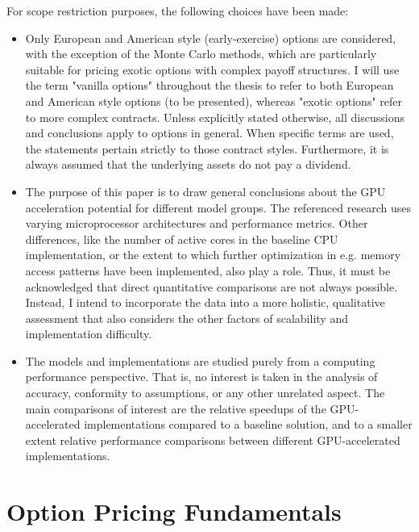 \documentclass[english,12pt,a4paper,pdftex,sci,utf8]{aaltothesis}
\begin{document}
For scope restriction purposes, the following choices have been made:
\begin{itemize}
    \item Only European and American style (early-exercise) options are considered, with the exception of the Monte Carlo methods, which are particularly suitable for pricing exotic options with complex payoff structures. I will use the term "vanilla options" throughout the thesis to refer to both European and American style options (to be presented), whereas "exotic options" refer to more complex contracts. Unless explicitly stated otherwise, all discussions and conclusions apply to options in general. When specific terms are used, the statements pertain strictly to those contract styles. Furthermore, it is always assumed that the underlying assets do not pay a dividend.
    
    \item The purpose of this paper is to draw general conclusions about the GPU acceleration potential for different model groups. The referenced research uses varying microprocessor architectures and performance metrics. Other differences, like the number of active cores in the baseline CPU implementation, or the extent to which further optimization in e.g. memory access patterns have been implemented, also play a role. Thus, it must be acknowledged that direct quantitative comparisons are not always possible. Instead, I intend to incorporate the data into a more holistic, qualitative assessment that also considers the other factors of scalability and implementation difficulty.

    \item The models and implementations are studied purely from a computing performance perspective. That is, no interest is taken in the analysis of accuracy, conformity to assumptions, or any other unrelated aspect. The main comparisons of interest are the relative speedups of the GPU-accelerated implementations compared to a baseline solution, and to a smaller extent relative performance comparisons between different GPU-accelerated implementations.
\end{itemize}


\clearpage

\section{Option Pricing Fundamentals} \label{sec:optionfundamentals}
\end{document}
